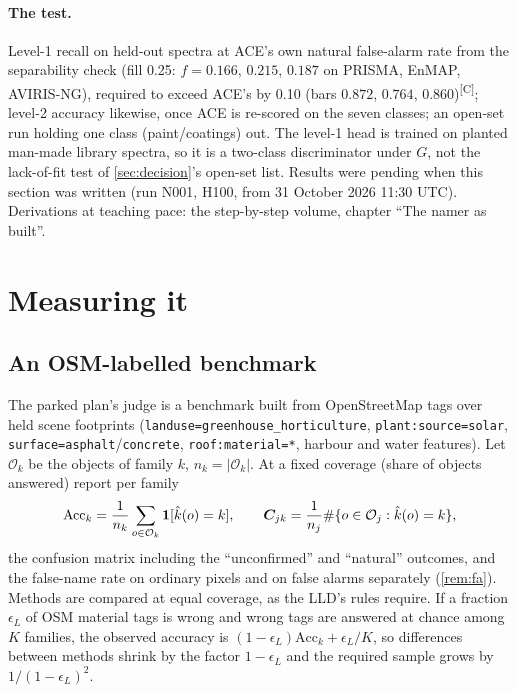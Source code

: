 \documentclass[11pt,a4paper]{article}
\theoremstyle{plain}
\theoremstyle{definition}
\theoremstyle{remark}
\newcommand{\comp}{\textsuperscript{\textsf{\scriptsize[C]}}}
\begin{document}
\paragraph{The test.} Level-1 recall on held-out spectra at ACE's own natural false-alarm rate from the separability check (fill 0.25: $f=0.166$, $0.215$, $0.187$
on PRISMA, EnMAP, AVIRIS-NG), required to exceed ACE's by 0.10 (bars $0.872$, $0.764$, $0.860$)\comp; level-2 accuracy likewise, once ACE is re-scored on the seven
classes; an open-set run holding one class (paint/coatings) out. The level-1 head is trained on planted man-made library spectra, so it is a two-class
discriminator under $G$, not the lack-of-fit test of \cref{sec:decision}'s open-set list. Results were pending when this section was written (run N001, H100,
from 31 October 2026 11:30 UTC). Derivations at teaching pace: the step-by-step volume, chapter ``The namer as built''.

\section{Measuring it}
\label{sec:measure}

\subsection{An OSM-labelled benchmark}

The parked plan's judge is a benchmark built from OpenStreetMap tags over held scene footprints
(\verb|landuse=greenhouse_horticulture|, \verb|plant:source=solar|, \verb|surface=asphalt|/\verb|concrete|,
\verb|roof:material=*|, harbour and water features). Let $\mathcal O_k$ be the objects of family $k$, $n_k=|\mathcal O_k|$. At a fixed
coverage (share of objects answered) report per family
\[
  \mathrm{Acc}_k=\frac1{n_k}\sum_{o\in\mathcal O_k}\bm{1}[\hat k(o)=k],\qquad
  \bm{C}_{jk}=\frac1{n_j}\#\{o\in\mathcal O_j:\hat k(o)=k\},
\]
the confusion matrix including the ``unconfirmed'' and ``natural'' outcomes, and the false-name rate on ordinary pixels and on false
alarms separately (\cref{rem:fa}). Methods are compared at equal coverage, as the LLD's rules require. If a fraction $\epsilon_L$ of
OSM material tags is wrong and wrong tags are answered at chance among $K$ families, the observed accuracy is
$(1-\epsilon_L)\mathrm{Acc}_k+\epsilon_L/K$, so differences between methods shrink by the factor $1-\epsilon_L$ and the required sample
grows by $1/(1-\epsilon_L)^2$.
\end{document}

